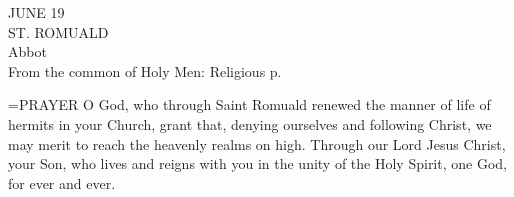 \begin{center}\normalsize JUNE 19\\
\footnotesize ST. ROMUALD\\
\footnotesize Abbot\\
\footnotesize From the common of Holy Men: Religious p. \\
\end{center}

\hangindent=\parindent \small{PRAYER 
O God, who through Saint Romuald renewed
the manner of life of hermits in your Church,
grant that, denying ourselves and following Christ,
we may merit to reach the heavenly realms on high.
Through our Lord Jesus Christ, your Son,
who lives and reigns with you in the unity of the Holy Spirit,
one God, for ever and ever.\\}
 
